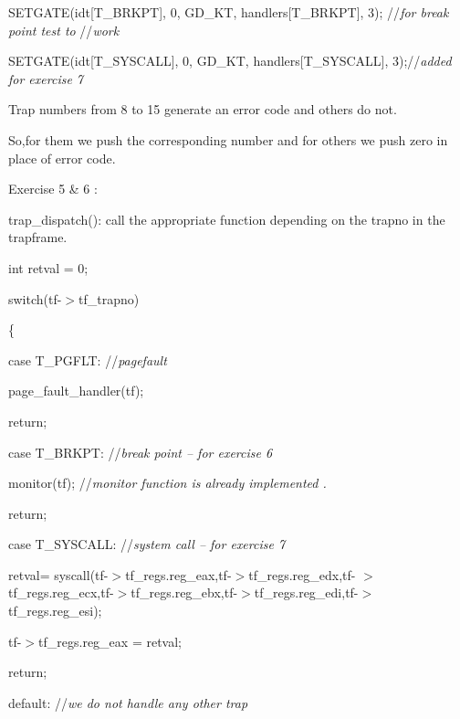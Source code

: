 \documentclass[a4paper,portrait,12pt]{article}
\begin{document}
	SETGATE(idt[T\_BRKPT], 0, GD\_KT, handlers[T\_BRKPT], 3); //\emph{for break point test to} 									       //\emph{work}


           SETGATE(idt[T\_SYSCALL], 0, GD\_KT, handlers[T\_SYSCALL], 3);//\emph{added for exercise 7}





Trap numbers from 8 to 15 generate an error code and others do not.


So,for them we push the corresponding number and for others we push zero in place of error code.








Exercise 5 \& 6 :





trap\_dispatch(): call the appropriate function depending on the trapno in the trapframe.


	


	int retval = 0;


	switch(tf-$>$tf\_trapno)


	\{


		case T\_PGFLT:  //\emph{pagefault}


			page\_fault\_handler(tf);


			return;


		


		case T\_BRKPT: //\emph{break point -- for exercise 6}


			monitor(tf); //\emph{monitor function is already implemented .}


			return;


		


		case T\_SYSCALL: //\emph{system call -- for exercise 7}


			


			retval= syscall(tf-$>$tf\_regs.reg\_eax,tf-$>$tf\_regs.reg\_edx,tf-		$>$tf\_regs.reg\_ecx,tf-$>$tf\_regs.reg\_ebx,tf-$>$tf\_regs.reg\_edi,tf-$>$tf\_regs.reg\_esi);


			tf-$>$tf\_regs.reg\_eax = retval;


			return;


	


	


	default: //\emph{we do not handle any other trap}
\end{document}
